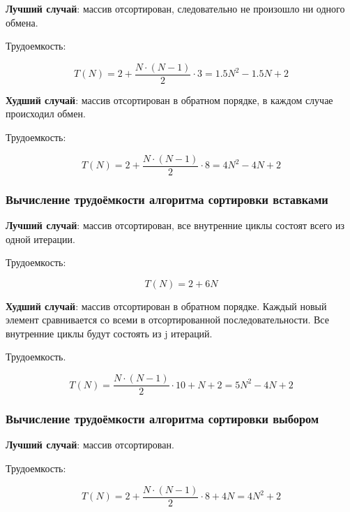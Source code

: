\documentclass[a4paper,14pt, unknownkeysallowed]{extreport}
\begin{document}
\textbf{Лучший случай}: массив отсортирован, следовательно не произошло ни одного обмена.

Трудоемкость:

\begin{equation}
    T(N) = 2 + \frac{N \cdot (N - 1)}{2}\cdot 3 = 1.5N^2 - 1.5N + 2
\end{equation}

\textbf{Худший случай}: массив отсортирован в обратном порядке, в каждом случае происходил обмен.

Трудоемкость:

\begin{equation}
    T(N) = 2 + \frac{N \cdot (N - 1)}{2}\cdot 8 = 4N^2 - 4N + 2
\end{equation}

\subsubsection{Вычисление трудоёмкости алгоритма сортировки вставками}

\textbf{Лучший случай}: массив отсортирован, все внутренние циклы состоят всего из одной итерации.

Трудоемкость:

\begin{equation}
    T(N) = 2 + 6N
\end{equation}

\textbf{Худший случай}: массив отсортирован в обратном порядке. Каждый новый элемент сравнивается со всеми в отсортированной последовательности. Все внутренние циклы будут состоять из j итераций.

Трудоемкость.

\begin{equation}
    T(N) = \frac{N \cdot (N - 1)}{2} \cdot 10 + N + 2 = 5N^2 - 4N + 2
\end{equation}

\subsubsection{Вычисление трудоёмкости алгоритма сортировки выбором}

\textbf{Лучший случай}: массив отсортирован.

Трудоемкость:

\begin{equation}
    T(N) = 2 + \frac{N \cdot (N - 1)}{2} \cdot 8 + 4N = 4N^2 + 2
\end{equation}
\end{document}
